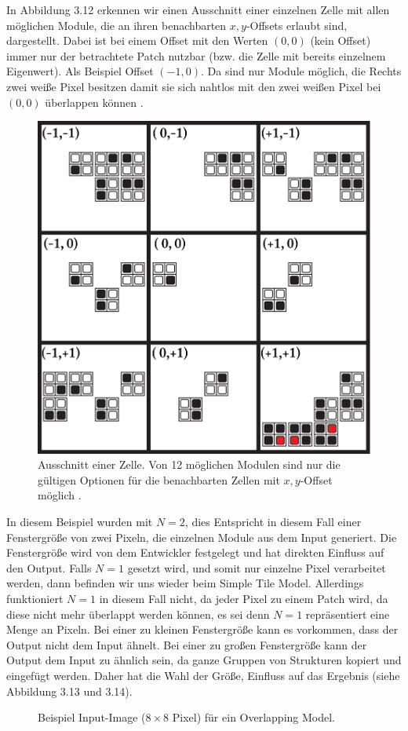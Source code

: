 \documentclass[12pt, a4paper,twoside,openany]{report} %
\begin{document}
In Abbildung 3.12 erkennen wir einen Ausschnitt einer einzelnen Zelle mit allen möglichen Module, die an ihren benachbarten $x,y$-Offsets erlaubt sind, dargestellt.
Dabei ist bei einem Offset mit den Werten $(0,0)$ {(kein Offset)} immer nur der betrachtete Patch nutzbar {(bzw. die Zelle mit bereits einzelnem Eigenwert)}.
Als Beispiel Offset $(-1,0)$. Da sind nur Module möglich, die Rechts zwei weiße Pixel besitzen damit sie sich nahtlos mit den zwei weißen Pixel bei $(0,0)$ überlappen können \cite{Karth2017WaveFunctionCollapseIC}.

\begin{figure}[H]
    \centering
    \includegraphics[width=0.5\linewidth]{images/red-maze-offset-example.png}%
    \caption{Ausschnitt einer Zelle. Von 12 möglichen Modulen sind nur die gültigen Optionen für die benachbarten Zellen mit $x,y$-Offset möglich \cite{Karth2017WaveFunctionCollapseIC}.}%
\end{figure}

In diesem Beispiel wurden mit $N = 2$, dies Entspricht in diesem Fall einer Fenstergröße von zwei Pixeln, die einzelnen Module aus dem Input generiert.
Die Fenstergröße wird von dem Entwickler festgelegt und hat direkten Einfluss auf den Output.
Falls $N = 1$ gesetzt wird, und somit nur einzelne Pixel verarbeitet werden, dann befinden wir uns wieder beim Simple Tile Model.
Allerdings funktioniert $N = 1$ in diesem Fall nicht, da jeder Pixel zu einem Patch wird, da diese nicht mehr überlappt werden können,
es sei denn $N = 1$ repräsentiert eine Menge an Pixeln.
Bei einer zu kleinen Fenstergröße kann es vorkommen, dass der Output nicht dem Input ähnelt.
Bei einer zu großen Fenstergröße kann der Output dem Input zu ähnlich sein, da ganze Gruppen von Strukturen kopiert und eingefügt werden.
Daher hat die Wahl der Größe, Einfluss auf das Ergebnis {(siehe Abbildung 3.13 und 3.14)}.

\begin{figure}[H]
    \centering
    \caption{Beispiel Input-Image ($8\times8$ Pixel) für ein Overlapping Model.}%
\end{figure}
\end{document}
